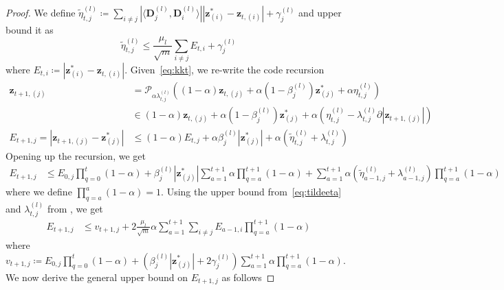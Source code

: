 \documentclass[10pt]{article} %
\newcommand{\D}{{\bm D}}
\newcommand{\z}{{\bm z}}
\newcommand{\prox}{\mathcal{P}}
\begin{document}
\begin{proof}
We define $\tilde \eta_{t,j}^{(l)} \coloneqq \sum_{i \neq j} | \langle \D_j^{(l)}, \D_i^{(l)} \rangle | | \z^{\ast}_{(i)} - \z_{t, (i)} | + \gamma_j^{(l)}$ and upper bound it as
\begin{equation}\label{eq:tildeeta}
\tilde \eta_{t,j}^{(l)} \leq \frac{\mu_l}{\sqrt{m}} \sum_{i \neq j} E_{t,i} + \gamma_j^{(l)}
\end{equation}
where $E_{t,i} \coloneqq |\z_{(i)}^{\ast}  - \z_{t,(i)}|$. Given~\eqref{eq:kkt}, we re-write the code recursion
\begin{equation}
\begin{aligned}
\z_{t+1, (j)} &= \prox_{\alpha \lambda_{t,j}^{(l)}}((1 - \alpha) \z_{t, (j)} + \alpha (1 - \beta_j^{(l)}) \z^{\ast}_{(j)} + \alpha \eta_{t,j}^{(l)})\\
&\in (1 - \alpha) \z_{t, (j)} + \alpha (1 - \beta_j^{(l)}) \z^{\ast}_{(j)} + \alpha (\eta_{t,j}^{(l)} - \lambda_{t,j}^{(l)} \partial | \z_{t+1, (j)} |)\\
E_{t+1, j} = | \z_{t+1, (j)} - \z_{(j)}^{\ast} | &\leq (1 - \alpha) E_{t, j} + \alpha \beta_j^{(l)} | \z^{\ast}_{(j)} | + \alpha (\tilde \eta_{t,j}^{(l)} + \lambda_{t,j}^{(l)} )
\end{aligned}
\end{equation}
Opening up the recursion, we get
\begin{equation}
\begin{aligned}
E_{t+1, j} &\leq E_{0,j} \prod_{q=0}^t (1 - \alpha) + \beta_j^{(l)} | \z^{\ast}_{(j)} | \sum_{a=1}^{t+1} \alpha \prod_{q=a}^{t+1} (1 - \alpha) + \sum_{a=1}^{t+1} \alpha (\tilde \eta_{a-1,j}^{(l)} + \lambda_{a-1,j}^{(l)} ) \prod_{q=a}^{t+1} (1 - \alpha)
\end{aligned}
\end{equation}
where we define $ \prod_{q=a}^a (1 - \alpha) = 1$. Using the upper bound from~\eqref{eq:tildeeta} and $\lambda_{t,j}^{(l)}$ from , we get
\begin{equation}
\begin{aligned}
E_{t+1, j} &\leq v_{t+1, j} + 2 \frac{\mu_l}{\sqrt{m}} \alpha \sum_{a=1}^{t+1} \sum_{i \neq j} E_{a-1, i} \prod_{q=a}^{t+1} (1 - \alpha)
\end{aligned}
\end{equation}
where $v_{t+1, j} \coloneqq E_{0, j} \prod_{q=0}^t (1 - \alpha) + (\beta_j^{(l)} | \z^{\ast}_{(j)} | + 2 \gamma_j^{(l)}) \sum_{a=1}^{t+1} \alpha \prod_{q=a}^{t+1} (1 - \alpha)$. We now derive the general upper bound on $E_{t+1, j}$ as follows

\end{proof}
\end{document}
